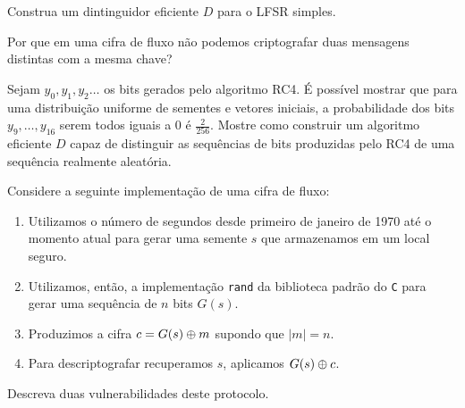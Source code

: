 \begin{exercicio}
  Construa um dintinguidor eficiente $D$ para o LFSR simples.
\end{exercicio}

\begin{exercicio}
  Por que em uma cifra de fluxo não podemos criptografar duas mensagens distintas com a mesma chave?
\end{exercicio}

\begin{exercicio}
 Sejam $y_0, y_1, y_2 \dots$ os bits gerados pelo algoritmo RC4.
É possível mostrar que para uma distribuição uniforme de sementes e vetores iniciais, a probabilidade dos bits $y_9, \dots, y_{16}$ serem todos iguais a $0$ é $\frac{2}{256}$.
Mostre como construir um algoritmo eficiente $D$ capaz de distinguir as sequências de bits produzidas pelo RC4 de uma sequência realmente aleatória.
\end{exercicio}

\begin{exercicio}
  Considere a seguinte implementação de uma cifra de fluxo:
\begin{enumerate}
\item Utilizamos o número de segundos desde primeiro de janeiro de 1970 até o momento atual para gerar uma semente $s$ que armazenamos em um local seguro.
\item Utilizamos, então, a implementação {\tt rand} da biblioteca padrão do {\tt C} para gerar uma sequência de $n$ bits $G(s)$.
\item Produzimos a cifra $c = G(s) \oplus m$ supondo que $|m| = n$.
\item Para descriptografar recuperamos $s$, aplicamos $G(s) \oplus c$.
\end{enumerate}

  Descreva duas vulnerabilidades deste protocolo.
\end{exercicio}



